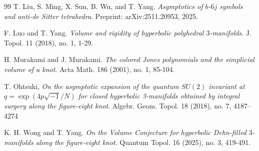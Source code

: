 \documentclass[11pt]{article}
\theoremstyle{remark}
\theoremstyle{remark}
\numberwithin{equation}{section}
\begin{document}
\begin{thebibliography}{99}
T. Liu, S. Ming, X. Sun, B. Wu, and T. Yang.
{\em Asymptotics of $b$-$6j$ symbols and anti-de Sitter tetrahedra}.
Preprint: arXiv:2511.20953, 2025.

F. Luo and T. Yang.
{\em Volume and rigidity of hyperbolic polyhedral $3$-manifolds}.
J. Topol. 11 (2018), no. 1, 1-29.

H. Murakami and J. Murakami.
{\em The colored Jones polynomials and the simplicial volume of a knot}.
Acta Math. 186 (2001), no. 1, 85-104.

 T. Ohtsuki, {\em On the asymptotic expansion of the quantum $SU(2)$ invariant at
$q=\exp(4p\sqrt{-1}/N)$ for closed hyperbolic 3-manifolds obtained by integral surgery
along the figure-eight knot}. Algebr. Geom. Topol. 18 (2018), no. 7, 4187–4274


K. H. Wong and T. Yang.
{\em On the Volume Conjecture for hyperbolic Dehn-filled $3$-manifolds
along the figure-eight knot}.
Quantum Topol. 16 (2025), no. 3, 419-491.

\end{thebibliography}
\end{document}

